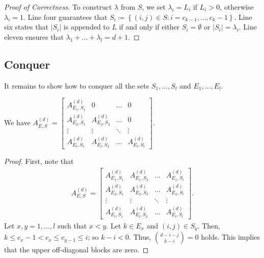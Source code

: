 \begin{proof}[Proof of Correctness]
    To construct \( \lambda  \) from \( S \), we set \( \lambda_i = L_i \) if \( L_i > 0 \), otherwise \( \lambda_i = 1 \).
    Line four guarantees that \( S_i \coloneqq \left\{ (i,j) \in S : i = c_{k-1}, \dots, c_k - 1 \right\} \). Line six states that \( \lvert S_i \rvert \) is appended to \( L \) if and only if either \( S_i = \emptyset \) or \( \lvert S_i \rvert = \lambda_i \). Line eleven ensures that \(  \lambda_1 + \dots + \lambda_l = d+1  \).
\end{proof}




\subsection*{Conquer}

It remains to show how to conquer all the sets \( S_1, \dots, S_l \) and \( E_1, \dots, E_l \).

\begin{proposition}
    We have \( A_{E,S}^{(d)} = 
    \begin{bmatrix}
        A_{E_1,S_1}^{(d)} & 0 & \dots & 0 \\
        A_{E_2,S_1}^{(d)} & A_{E_2,S_2}^{(d)} & \dots & 0 \\
        \vdots & \vdots & \ddots & \vdots \\
        A_{E_l,S_1}^{(d)} & A_{E_l,S_2}^{(d)} & \dots & A_{E_l,S_l}^{(d)}
    \end{bmatrix} \).
\end{proposition}

\begin{proof}
    First, note that 
    \begin{align*}
        A_{E,S}^{(d)} = 
        \begin{bmatrix}
            A_{E_1,S_1}^{(d)} & A_{E_1,S_2}^{(d)} & \dots & A_{E_1,S_l}^{(d)} \\
            A_{E_2,S_1}^{(d)} & A_{E_2,S_2}^{(d)} & \dots & A_{E_2,S_l}^{(d)} \\
            \vdots & \vdots & \ddots & \vdots \\
            A_{E_l,S_1}^{(d)} & A_{E_l,S_2}^{(d)} & \dots & A_{E_l,S_l}^{(d)}
        \end{bmatrix}.
    \end{align*}
    Let \( x,y = 1, \dots , l \) such that \( x < y \). Let \( k \in E_x \) and \( (i,j) \in S_y \).
    Then, \( k \leq c_x - 1 < c_x \leq c_{y - 1} \leq i \); so \( k - i < 0 \). Thus, \( \binom{d-i-j}{k-i} = 0 \) holds. This implies that the upper off-diagonal blocks are zero.
\end{proof}

